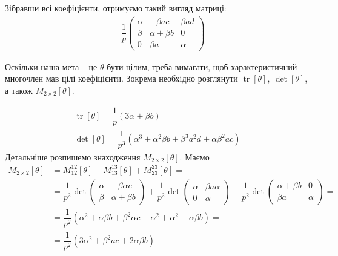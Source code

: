 \documentclass{thesis}
\DeclareMathOperator{\tr}{tr}
\begin{document}
Зібравши всі коефіцієнти, отримуємо такий вигляд матриці:
\begin{align*}
[\theta] = \dfrac{1}{p} \begin{pmatrix}
\alpha & -\beta a c & \beta a d \\
\beta & \alpha + \beta b & 0 \\
0 & \beta a & \alpha
\end{pmatrix}
\end{align*}

Оскільки наша мета -- це $\theta$ бути цілим, треба вимагати, щоб характеристичний многочлен мав цілі коефіцієнти. Зокрема необхідно розглянути $\tr [\theta],\ \det [\theta]$, а також $M_{2 \times 2}[\theta]$.

\begin{align*}
\tr [\theta] = \dfrac{1}{p} (3 \alpha + \beta b) \\
\det [\theta] = \dfrac{1}{p^3} \left( \alpha^3 + \alpha^2 \beta b + \beta^3 a^2 d + \alpha \beta^2 ac \right)
\end{align*}
Детальніше розпишемо знаходження $M_{2 \times 2}[\theta]$. Маємо
\begin{align*}
M_{2 \times 2}[\theta] & = M_{12}^{12}[\theta] + M_{13}^{13}[\theta] + M_{23}^{23}[\theta] = \\
& = \dfrac{1}{p^2} \det \begin{pmatrix}
\alpha & -\beta \alpha c \\
\beta & \alpha + \beta b
\end{pmatrix} + \dfrac{1}{p^2} \det \begin{pmatrix}
\alpha & \beta a \alpha \\
0 & \alpha
\end{pmatrix} + \dfrac{1}{p^2} \det \begin{pmatrix}
\alpha + \beta b & 0 \\
\beta a & \alpha
\end{pmatrix} = \\
& = \dfrac{1}{p^2} \left( \alpha^2 + \alpha \beta b + \beta^2 \alpha c + \alpha^2 + \alpha^2 + \alpha \beta b \right) = \\ 
& = \dfrac{1}{p^2} \left( 3 \alpha^2 + \beta^2 a c + 2 \alpha \beta b\right)
\end{align*}
\end{document}

